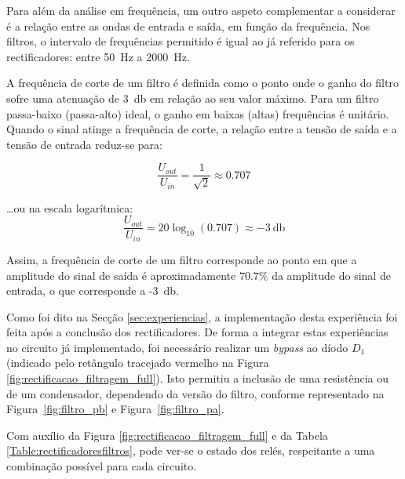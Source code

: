 	Para além da análise em frequência, um outro aspeto complementar a considerar é a relação entre as ondas de entrada e saída, em função da frequência. Nos filtros, o intervalo de frequências permitido é igual ao já referido para os rectificadores: entre \SI{50}{\hertz} a \SI{2000}{\hertz}. 
	
	A frequência de corte de um filtro é definida como o ponto onde o ganho do filtro sofre uma atenuação de \SI{3}{\decibel} em relação ao seu valor máximo. 	Para um filtro passa-baixo (passa-alto) ideal, o ganho em baixas (altas) frequências é unitário. Quando o sinal atinge a frequência de corte, a relação entre a tensão de saída e a tensão de entrada reduz-se para:  
	
	\begin{equation} \label{eq:relacaoGanho}
		\frac{U_{out}}{U_{in}} = \frac{1}{\sqrt{2}} \approx 0.707
	\end{equation}
	
	\ldots ou na escala logarítmica:  
\begin{equation} \label{eq:relacaoGanhodB}
	\frac{U_{out}}{U_{in}} = 20 \log_{10} (0.707) \approx -\SI{3}{\decibel}	
\end{equation}
	
Assim, a frequência de corte de um filtro corresponde ao ponto em que a amplitude do sinal de saída é aproximadamente $70.7\%$ da amplitude do sinal de entrada, o que corresponde a -\SI{3}{\decibel}. 

Como foi dito na Secção \ref{sec:experiencias}, a implementação desta experiência foi feita após a conclusão dos rectificadores. De forma a integrar estas experiências no circuito já implementado, foi necessário realizar um \textit{bypass} ao díodo $D_{1}$ (indicado pelo retângulo tracejado vermelho na Figura \ref{fig:rectificacao_filtragem_full}). Isto permitiu a inclusão de uma resistência ou de um condensador, dependendo da versão do filtro, conforme representado na Figura~\ref{fig:filtro_pb} e Figura~\ref{fig:filtro_pa}.

Com auxílio da Figura \ref{fig:rectificacao_filtragem_full} e da Tabela \ref{Table:rectificadoresfiltros}, pode ver-se o estado dos relés, respeitante a uma combinação possível para cada circuito. 

